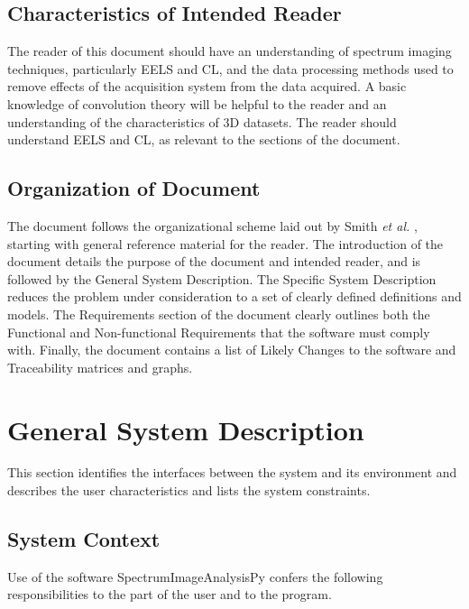 \documentclass[12pt]{article}
\newcommand{\progname}{SpectrumImageAnalysisPy} %
\begin{document}
\subsection{Characteristics of Intended Reader} 
The reader of this document should have an understanding of spectrum imaging
techniques, particularly EELS and CL, and the data processing methods used to
remove effects of the acquisition system from the data acquired. A basic
knowledge of convolution theory will be helpful to the reader and an
understanding of the characteristics of 3D datasets. The reader should
understand EELS and CL, as relevant to the sections of the document.  

\subsection{Organization of Document}

The document follows the organizational scheme laid out by Smith \textit{et al.}
\cite{SmithAndLai2005, smith_requirements_2007}, starting with general reference
material for the reader. The introduction of the document details the purpose of
the document and intended reader, and is followed by the General System
Description. The Specific System Description reduces the problem under
consideration to a set of clearly defined definitions and models. The
Requirements section of the document clearly outlines both the Functional and
Non-functional Requirements that the software must comply with. Finally, the
document contains a list of Likely Changes to the software and Traceability
matrices and graphs.

\section{General System Description}

This section identifies the interfaces between the system and its environment
and describes the user characteristics and lists the system constraints.

\subsection{System Context}

Use of the software \progname{} confers the following responsibilities to the
part of the user and to the program.
\end{document}
